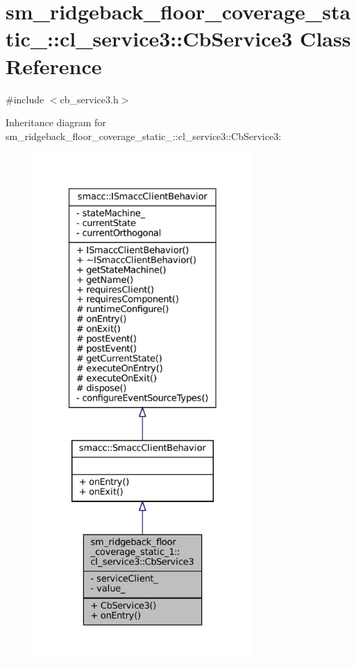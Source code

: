 \hypertarget{classsm__ridgeback__floor__coverage__static__1_1_1cl__service3_1_1CbService3}{}\section{sm\+\_\+ridgeback\+\_\+floor\+\_\+coverage\+\_\+static\+\_\+:\+:cl\+\_\+service3\+:\+:Cb\+Service3 Class Reference}
\label{classsm__ridgeback__floor__coverage__static__1_1_1cl__service3_1_1CbService3}


{\ttfamily \#include $<$cb\+\_\+service3.\+h$>$}



Inheritance diagram for sm\+\_\+ridgeback\+\_\+floor\+\_\+coverage\+\_\+static\+\_\+:\+:cl\+\_\+service3\+:\+:Cb\+Service3\+:
\nopagebreak
\begin{figure}[H]
\begin{center}
\leavevmode
\includegraphics[height=550pt]{classsm__ridgeback__floor__coverage__static__1_1_1cl__service3_1_1CbService3__inherit__graph}
\end{center}
\end{figure}


